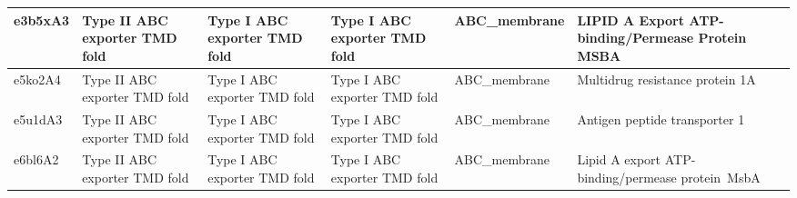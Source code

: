\begin{table}
{\begin{tabular}{!{\color{white}\vrule}l!{\color{black}\vrule}l!{\color{black}\vrule}l!{\color{black}\vrule}l!{\color{black}\vrule}l!{\color{black}\vrule}l!{\color{black}\vrule}}
\hline
{} e3b5xA3                                                                                                & Type II ABC exporter TMD fold                                      & Type I ABC exporter TMD fold                                       & Type I ABC exporter TMD fold                                       & ABC\_membrane                                                                       & LIPID A Export ATP-binding/Permease Protein MSBA                                     \\ 
\hline
{} e5ko2A4                                                                                                & Type II ABC exporter TMD fold                                      & Type I ABC exporter TMD fold                                       & Type I ABC exporter TMD fold                                       & ABC\_membrane                                                                       & Multidrug resistance protein 1A                                                      \\ 
\hline
{} e5u1dA3                                                                                                & Type II ABC exporter TMD fold                                      & Type I ABC exporter TMD fold                                       & Type I ABC exporter TMD fold                                       & ABC\_membrane                                                                       & Antigen peptide transporter 1                                                        \\ 
\hline
{} e6bl6A2                                                                                                & Type II ABC exporter TMD fold                                      & Type I ABC exporter TMD fold                                       & Type I ABC exporter TMD fold                                       & ABC\_membrane                                                                       & Lipid A export ATP-binding/permease protein~MsbA                                     \\
\hline
\end{tabular}
}
\label{ecod1}
\end{table}


